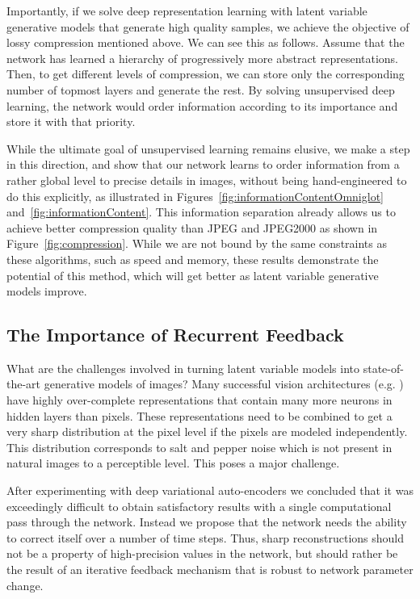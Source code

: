 \documentclass{article}
\begin{document}
Importantly, if we solve deep representation learning with latent variable generative models that generate high quality samples, we achieve the objective of lossy compression mentioned above. We can see this as follows. Assume that the network has learned a hierarchy of progressively more abstract representations. Then, to get different levels of compression, we can store only the corresponding number of topmost layers and generate the rest. By solving unsupervised deep learning, the network would order information according to its importance and store it with that priority.

While the ultimate goal of unsupervised learning remains elusive, we make a step in this direction, and show that our network learns to order information from a rather global level to precise details in images, without being hand-engineered to do this explicitly, as illustrated in Figures~\ref{fig:informationContentOmniglot} and~\ref{fig:informationContent}. This information separation already allows us to achieve better compression quality than JPEG and JPEG2000 as shown in Figure~\ref{fig:compression}. While we are not bound by the same constraints as these algorithms, such as speed and memory, these results demonstrate the potential of this method, which will get better as latent variable generative models improve.





\subsection{The Importance of Recurrent Feedback}

What are the challenges involved in turning latent variable models into state-of-the-art generative models of images? Many successful vision architectures (e.g. \citealp{simonyan2014very}) have highly over-complete representations that contain many more neurons in hidden layers than pixels. These representations need to be combined to get a very sharp distribution at the pixel level if the pixels are modeled independently. This distribution corresponds to salt and pepper noise which is not present in natural images to a perceptible level. This poses a major challenge. 











After experimenting with deep variational auto-encoders we concluded that it was exceedingly difficult to obtain satisfactory results with a single computational pass through the network. Instead we propose that the network needs the ability to correct itself over a number of time steps. Thus, sharp reconstructions should not be a property of high-precision values in the network, but should rather be the result of an iterative feedback mechanism that is robust to network parameter change. 
\end{document}
